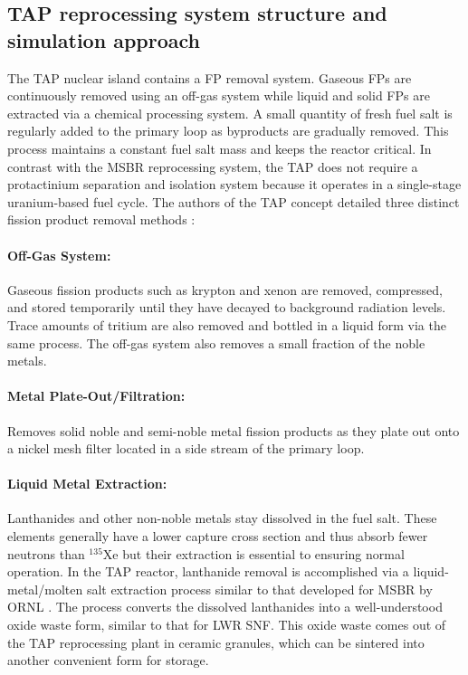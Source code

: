 \documentclass[12pt]{article} %
\begin{document}
\subsection{TAP reprocessing system structure and simulation approach}
The \gls{TAP} nuclear island contains a \gls{FP} removal system. Gaseous 
\glspl{FP} are continuously removed using an off-gas system while liquid 
and solid \glspl{FP} are extracted via a chemical processing system. A small 
quantity of fresh fuel salt is regularly added to the primary loop as  
byproducts are gradually removed. This process maintains a constant fuel salt 
mass and keeps the reactor critical. In contrast with the \gls{MSBR} 
reprocessing system, the \gls{TAP} does not require a protactinium separation 
and isolation system because it operates in a single-stage uranium-based fuel 
cycle. The authors of the \gls{TAP} concept detailed three distinct fission 
product removal methods \cite{transatomic_power_corporation_neutronics_2016}:
\paragraph{Off-Gas System:} Gaseous fission products such as krypton 
and xenon are removed, compressed, and stored temporarily until they have 
decayed to background radiation levels. Trace amounts of tritium are also 
removed and bottled in a liquid form via the same process. The off-gas system 
also removes a small fraction of the noble metals.
\paragraph{Metal Plate-Out/Filtration:} Removes solid noble and semi-noble 
metal fission products as they plate out onto a nickel mesh filter located in 
a side stream of the primary loop.
\paragraph{Liquid Metal Extraction:} Lanthanides and other non-noble 
metals stay dissolved in the fuel salt. These elements generally have a lower 
capture cross section and thus absorb fewer neutrons than $^{135}$Xe but their 
extraction is essential to ensuring normal operation. In the \gls{TAP} 
reactor, lanthanide removal is accomplished via a liquid-metal/molten salt 
extraction process similar to that developed for \gls{MSBR} by \gls{ORNL} 
\cite{robertson_conceptual_1971}. The process converts the dissolved 
lanthanides into a well-understood oxide waste form, similar to that for  
\gls{LWR} \gls{SNF}. This oxide waste comes out of the \gls{TAP} reprocessing 
plant in ceramic granules, which can be sintered into another convenient form 
for storage.
\end{document}
